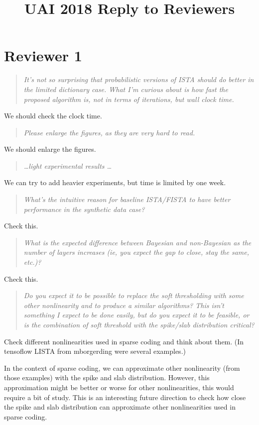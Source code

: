 \documentclass{article}
\begin{document}
\title{UAI 2018 Reply to Reviewers}
\date{}
\maketitle

\section*{Reviewer 1}
\begin{quote}
\textit{It's not so surprising that probabilistic versions of ISTA should do better in the limited dictionary case. What I'm curious about is how fast the proposed algorithm is, not in terms of iterations, but wall clock time.}
\end{quote}
We should check the clock time.

\begin{quote}
\textit{Please enlarge the figures, as they are very hard to read.}
\end{quote}
We should enlarge the figures.

\begin{quote}
\textit{\ldots light experimental results \ldots}
\end{quote}
We can try to add heavier experiments, but time is limited by one week.

\begin{quote}
\textit{What's the intuitive reason for baseline ISTA/FISTA to have better performance in the synthetic data case?}
\end{quote}
Check this.

\begin{quote}
\textit{What is the expected difference between Bayesian and non-Bayesian as the number of layers increases (ie, you expect the gap to close, stay the same, etc.)?}
\end{quote}
Check this.

\begin{quote}
\textit{Do you expect it to be possible to replace the soft thresholding with some other nonlinearity and to produce a similar algorithms? This isn't something I expect to be done easily, but do you expect it to be feasible, or is the combination of soft threshold with the spike/slab distribution critical?}
\end{quote}
Check different nonlinearities used in sparse coding and think about them. (In tensoflow LISTA from mborgerding were several examples.)

In the context of sparse coding, we can approximate other nonlinearity (from those examples) with the spike and slab distribution. However, this approximation might be better or worse for other nonlinearities, this would require a bit of study. This is an interesting future direction to check how close the spike and slab distribution can approximate other nonlinearities used in sparse coding.
\end{document}
